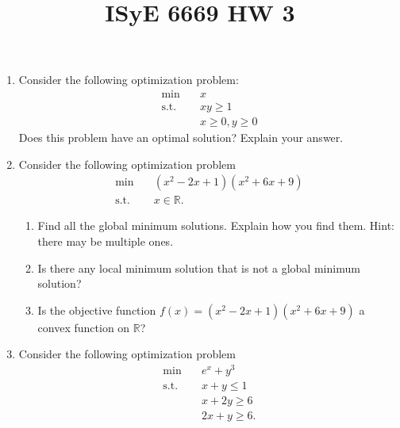 \documentclass{article}
\title{ISyE 6669 HW 3}
\date{}
\begin{document}
\maketitle


\begin{enumerate}

\item Consider the following optimization problem:
\begin{align*}
\min \quad & x \\
\text{s.t.}\quad & xy \geq 1\\
\text{}\quad & x \geq 0, y \geq 0
\end{align*}
Does this problem have an optimal solution? Explain your answer.

\item Consider the following optimization problem
\begin{align*}
    \min \quad & (x^2 - 2x + 1)(x^2 + 6x + 9) \\
    \text{s.t.} \quad & x \in \mathbb{R}.
\end{align*}
\begin{enumerate}
    \item Find all the global minimum solutions. Explain how you find them. Hint: there may be multiple ones. 
    
    \item Is there any local minimum solution that is not a global minimum solution?
    
    \item Is the objective function $f(x)=(x^2 - 2x + 1)(x^2 + 6x + 9)$ a convex function on $\mathbb{R}$?
\end{enumerate}

\item Consider the following optimization problem
\begin{align*}
    \min \quad & e^x + y^3\\
    \text{s.t.} \quad & x + y \le 1 \\
                      & x + 2y \ge 6 \\
                      & 2x + y  \ge 6.
\end{align*}


\end{enumerate}
\end{document}
